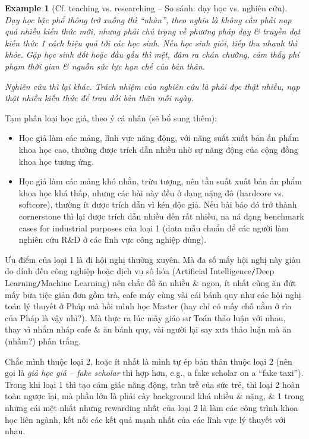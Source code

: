 \documentclass[12pt,twoside]{book}
\newtheorem{example}{Example}
\begin{document}
\begin{example}[Cf. teaching vs. researching -- So sánh: dạy học vs. nghiên cứu]
	Dạy học bậc phổ thông trở xuống thì ``nhàn'', theo nghĩa là không cần phải nạp quá nhiều kiến thức mới, nhưng phải chú trọng về phương pháp dạy \& truyền đạt kiến thức 1 cách hiệu quả tới các học sinh. Nếu học sinh giỏi, tiếp thu nhanh thì khỏe. Gặp học sinh dốt hoặc đầu gấu thì mệt, đâm ra chán chường, cảm thấy phí phạm thời gian \& nguồn sức lực hạn chế của bản thân.
	
	Nghiên cứu thì lại khác. Trách nhiệm của nghiên cứu là phải đọc thật nhiều, nạp thật nhiều kiến thức để trau dồi bản thân mỗi ngày.
\end{example}
Tạm phân loại học giả, theo ý cá nhân (sẽ bổ sung thêm):
\begin{itemize}
	\item Học giả làm các mảng, lĩnh vực năng động, với năng suất xuất bản ấn phẩm khoa học cao, thường được trích dẫn nhiều nhờ sự năng động của cộng đồng khoa học tương ứng.
	\item Học giả làm các mảng khó nhằn, trừu tượng, nên tần suất xuất bản ấn phẩm khoa học khá thấp, nhưng các bài này đều ở dạng nặng đô (hardcore vs. softcore), thường ít được trích dẫn vì kén độc giả. Nếu bài báo đó trở thành cornerstone thì lại được trích dẫn nhiều đến rất nhiều, na ná dạng benchmark cases for industrial purposes của loại 1 (data mẫu chuẩn để các người làm nghiên cứu R\&D ở các lĩnh vực công nghiệp dùng).
\end{itemize}
Ưu điểm của loại 1 là đi hội nghị thường xuyên. Mà đa số mấy hội nghị này giàu do dính đến công nghiệp hoặc dịch vụ số hóa (Artificial Intelligence{\tt/}Deep Learning{\tt/}Machine Learning) nên chắc đồ ăn nhiều \& ngon, ít nhất cũng ăn đứt mấy bữa tiệc giản đơn gồm trà, cafe máy cùng vài cái bánh quy như các hội nghị toán lý thuyết ở Pháp mà hồi mình học Master (hay chỉ có mấy chỗ nằm ở rìa của Pháp là vậy nhỉ?). Mà thực ra lúc mấy giáo sư Toán thảo luận với nhau, thay vì nhắm nháp cafe \& ăn bánh quy, vài người lại say xưa thảo luận mà ăn (nhầm?) phấn trắng.

Chắc mình thuộc loại 2, hoặc ít nhất là mình tự ép bản thân thuộc loại 2 (nên gọi là {\it giả học giả -- fake scholar} thì hợp hơn, e.g., a fake scholar on a ``fake taxi''). Trong khi loại 1 thì tạo cảm giác năng động, tràn trề của sức trẻ, thì loại 2 hoàn toàn ngược lại, mà phần lớn là phải cày background khá nhiều \& nặng, \& 1 trong những cái mệt nhất nhưng rewarding nhất của loại 2 là làm các công trình khoa học liên ngành, kết nối các kết quả mạnh nhất của các lĩnh vực lý thuyết với nhau.
\end{document}
